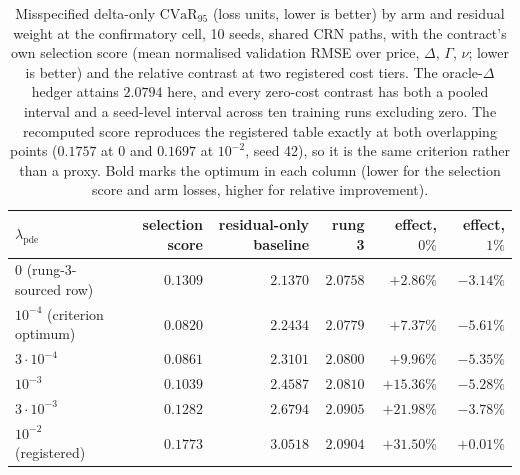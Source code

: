\documentclass{article}
\begin{document}
\begin{table}[!htbp]
\caption{Misspecified delta-only $\mathrm{CVaR}_{95}$ (loss units, lower is better)
by arm and residual weight at the confirmatory cell, 10 seeds, shared CRN paths,
with the contract's own selection score (mean normalised validation RMSE over
price, $\Delta$, $\Gamma$, $\nu$; lower is better) and the relative contrast at two
registered cost tiers. The oracle-$\Delta$ hedger attains $2.0794$ here, and every
zero-cost contrast has both a pooled interval and a seed-level interval across ten
training runs excluding zero. The
recomputed score reproduces the registered table exactly at both overlapping points
($0.1757$ at $0$ and $0.1697$ at $10^{-2}$, seed 42), so it is the same criterion
rather than a proxy. Bold marks the optimum in each column (lower for the selection
score and arm losses, higher for relative improvement).}
\label{tab:lambda}
\centering\footnotesize\setlength{\tabcolsep}{5pt}
\begin{tabular}{@{}lrrrrr@{}}
\toprule
$\lambda_{\mathrm{pde}}$ & selection score & residual-only baseline & rung 3 & effect, $0\%$ & effect, $1\%$ \\
\midrule
$0$ (rung-3-sourced row) & $0.1309$ & $\mathbf{2.1370}$ & $\mathbf{2.0758}$ & $+2.86\%$ & $-3.14\%$ \\
$10^{-4}$ (criterion optimum) & $\mathbf{0.0820}$ & $2.2434$ & $2.0779$ & $+7.37\%$ & $-5.61\%$ \\
$3\cdot10^{-4}$ & $0.0861$ & $2.3101$ & $2.0800$ & $+9.96\%$ & $-5.35\%$ \\
$10^{-3}$ & $0.1039$ & $2.4587$ & $2.0810$ & $+15.36\%$ & $-5.28\%$ \\
$3\cdot10^{-3}$ & $0.1282$ & $2.6794$ & $2.0905$ & $+21.98\%$ & $-3.78\%$ \\
$10^{-2}$ (registered) & $0.1773$ & $3.0518$ & $2.0904$ & $\mathbf{+31.50\%}$ & $\mathbf{+0.01\%}$ \\
\bottomrule
\end{tabular}
\end{table}
\end{document}
